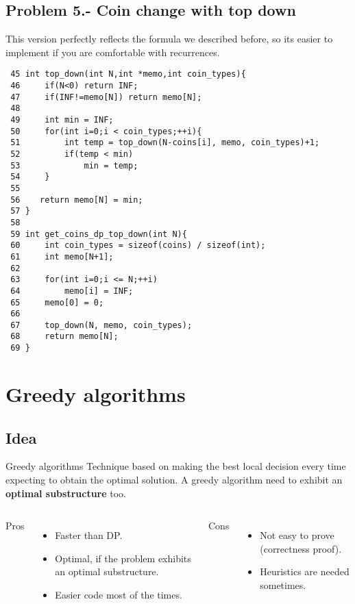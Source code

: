 \documentclass[article]{beamer}
\begin{document}

\subsection{Problem 5.- Coin change with top down}
\begin{frame}[fragile]
	This version perfectly reflects the formula we described before, so 
	its easier to implement if you are comfortable with recurrences.
	{\tiny
		\begin{lstlisting}
 45 int top_down(int N,int *memo,int coin_types){
 46     if(N<0) return INF;
 47     if(INF!=memo[N]) return memo[N];
 48 
 49     int min = INF;
 50     for(int i=0;i < coin_types;++i){
 51         int temp = top_down(N-coins[i], memo, coin_types)+1;
 52         if(temp < min)
 53             min = temp;
 54     }
 55 
 56    return memo[N] = min;
 57 }
 58 
 59 int get_coins_dp_top_down(int N){
 60     int coin_types = sizeof(coins) / sizeof(int);
 61     int memo[N+1];
 62 
 63     for(int i=0;i <= N;++i)
 64         memo[i] = INF;
 65     memo[0] = 0;
 66 
 67     top_down(N, memo, coin_types);
 68     return memo[N];
 69 } 
		\end{lstlisting}
	}
\end{frame}

\section{Greedy algorithms}
\subsection{Idea}

\begin{frame}[fragile]
	\begin{block}{Greedy algorithms}
	Technique based on making the best local decision every time expecting to
	obtain the optimal solution. A greedy algorithm need to exhibit an \textbf{optimal substructure} too. 
	\end{block}
\end{frame}

\begin{frame}[fragile]
	\begin{columns}
		Pros
		\begin{itemize}
			\item Faster than DP.
			\item Optimal, if the problem exhibits an optimal substructure.
			\item Easier code most of the times.
		\end{itemize}
		Cons
		\begin{itemize}
			\item Not easy to prove (correctness proof).
			\item Heuristics are needed sometimes.
		\end{itemize}
	\end{columns}
\end{frame}
\end{document}
